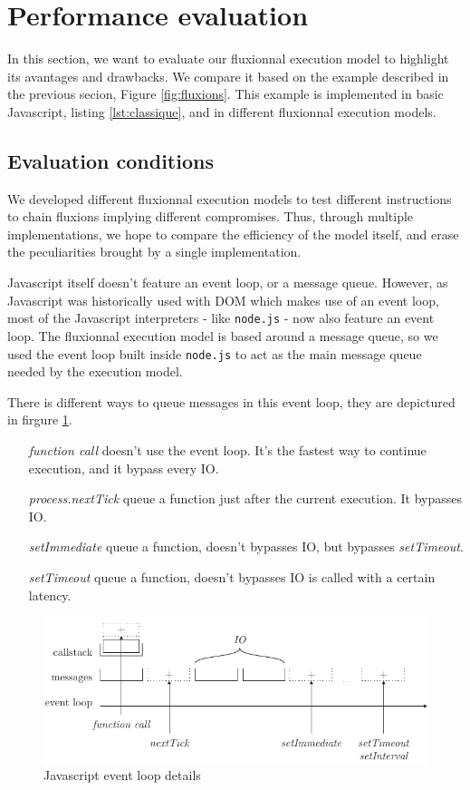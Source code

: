 \section{Performance evaluation}

In this section, we want to evaluate our fluxionnal execution model to highlight its avantages and drawbacks.
We compare it based on the example described in the previous secion, Figure \ref{fig:fluxions}.
This example is implemented in basic Javascript, listing \ref{lst:classique}, and in different fluxionnal execution models.

\subsection{Evaluation conditions}

We developed different fluxionnal execution models to test different instructions to chain fluxions implying different compromises.
Thus, through multiple implementations, we hope to compare the efficiency of the model itself, and erase the peculiarities brought by a single implementation.

Javascript itself doesn't feature an event loop, or a message queue.
However, as Javascript was historically used with DOM which makes use of an event loop, most of the Javascript interpreters - like \texttt{node.js} - now also feature an event loop.
The fluxionnal execution model is based around a message queue, so we used the event loop built inside \texttt{node.js} to act as the main message queue needed by the execution model.

There is different ways to queue messages in this event loop, they are depictured in firgure \ref{fig:eventloop}.
\begin{itemize}
	\item[\textit{function call}] doesn't use the event loop. It's the fastest way to continue execution, and it bypass every IO.
	\item[\textit{process.nextTick}] queue a function just after the current execution. It bypasses IO.
	\item[\textit{setImmediate}] queue a function, doesn't bypasses IO, but bypasses \textit{setTimeout}.
	\item[\textit{setTimeout}] queue a function, doesn't bypasses IO is called with a certain latency.
\end{itemize}

\begin{figure}[h!]
  \includegraphics[width=\linewidth]{eventloop.pdf}
  \caption{Javascript event loop details}
  \label{fig:eventloop}
\end{figure}

